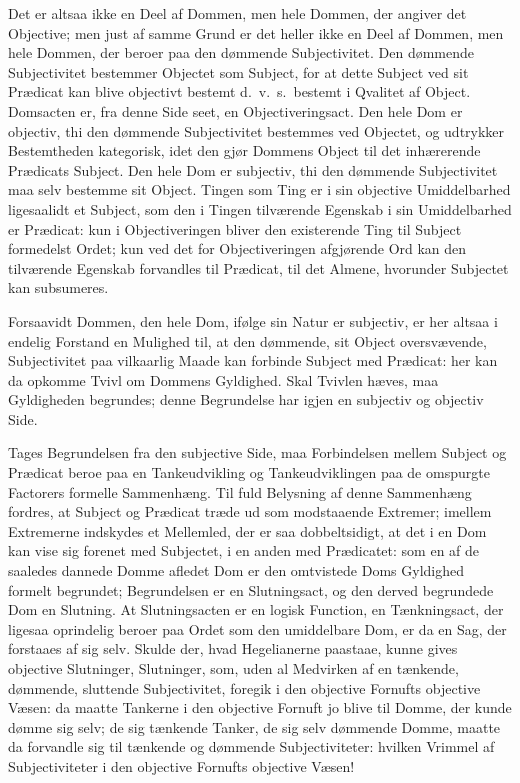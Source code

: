 \documentclass[12pt]{book}
\newcommand{\opage}[1]{\marginnote{\footnotesize\textit{[#1]}}}
\begin{document}
Det er altsaa ikke en Deel af Dommen, men hele Dommen, der angiver det Objective; men just af samme Grund er det heller ikke en Deel af Dommen, men hele Dommen, der beroer paa den dømmende Subjectivitet. Den dømmende Subjectivitet bestemmer Objectet som Subject, for at dette Subject ved sit Prædicat kan blive objectivt bestemt d.\ v.\ s.\ bestemt i Qvalitet af Object. Domsacten er, fra denne Side seet, en Objectiveringsact. Den hele Dom er objectiv, thi den dømmende Subjectivitet bestemmes ved Objectet, og udtrykker Bestemtheden kategorisk, idet den gjør Dommens Object til det inhærerende Prædicats Subject. Den hele Dom er subjectiv, thi den dømmende Subjectivitet maa selv bestemme sit Object. Tingen som Ting er i sin objective Umiddelbarhed ligesaalidt et Subject, som den i Tingen tilværende Egenskab
\opage{15}i sin Umiddelbarhed er Prædicat: kun i Objectiveringen bliver den existerende Ting til Subject formedelst Ordet; kun ved det for Objectiveringen afgjørende Ord kan den tilværende Egenskab forvandles til Prædicat, til det Almene, hvorunder Subjectet kan subsumeres.

Forsaavidt Dommen, den hele Dom, ifølge sin Natur er subjectiv, er her altsaa i endelig Forstand en Mulighed til, at den dømmende, sit Object oversvævende, Subjectivitet paa vilkaarlig Maade kan forbinde Subject med Prædicat: her kan da opkomme Tvivl om Dommens Gyldighed. Skal Tvivlen hæves, maa Gyldigheden begrundes; denne Begrundelse har igjen en subjectiv og objectiv Side.

Tages Begrundelsen fra den subjective Side, maa Forbindelsen mellem Subject og Prædicat beroe paa en Tankeudvikling og Tankeudviklingen paa de omspurgte Factorers formelle Sammenhæng. Til fuld Belysning af denne Sammenhæng fordres, at Subject og Prædicat træde ud som modstaaende Extremer; imellem Extremerne indskydes et Mellemled, der er saa dobbeltsidigt, at det i en Dom kan vise sig forenet med Subjectet, i en anden med Prædicatet: som en af de saaledes dannede Domme afledet Dom er den omtvistede Doms Gyldighed formelt begrundet; Begrundelsen er en Slutningsact, og den derved begrundede Dom en Slutning. At Slutningsacten er en logisk Function, en Tænkningsact, der ligesaa oprindelig beroer paa Ordet som den umiddelbare Dom, er da en Sag, der forstaaes af sig selv. Skulde der, hvad Hegelianerne paastaae, kunne gives objective Slutninger, Slutninger, som, uden al Medvirken af en tænkende, dømmende, sluttende Subjectivitet, foregik i den objective Fornufts objective Væsen: da maatte Tankerne i den objective Fornuft jo blive til Domme, der kunde dømme sig selv; de sig tænkende Tanker, de sig selv dømmende Domme, maatte da forvandle sig til tænkende og dømmende Subjectiviteter:
\opage{16}hvilken Vrimmel af Subjectiviteter i den objective Fornufts
objective Væsen!
\end{document}
